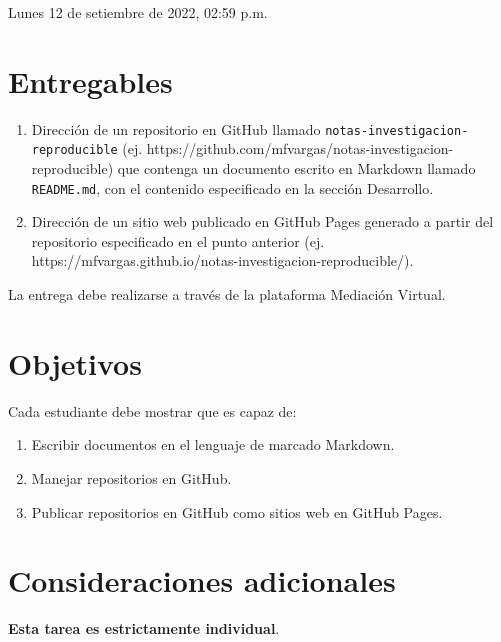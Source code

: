 \documentclass[
  letterpaper,
  DIV=11,
  numbers=noendperiod]{scrreprt}
\providecommand{\tightlist}{%
  \setlength{\itemsep}{0pt}\setlength{\parskip}{0pt}}\usepackage{longtable,booktabs,array}
\begin{document}
Lunes 12 de setiembre de 2022, 02:59 p.m.

\hypertarget{entregables}{%
\section*{Entregables}\label{entregables}}

\begin{enumerate}
\def\labelenumi{\arabic{enumi}.}
\tightlist
\item
  Dirección de un repositorio en GitHub llamado
  \texttt{notas-investigacion-reproducible} (ej.
  https://github.com/mfvargas/notas-investigacion-reproducible) que
  contenga un documento escrito en Markdown llamado \texttt{README.md},
  con el contenido especificado en la sección Desarrollo.
\item
  Dirección de un sitio web publicado en GitHub Pages generado a partir
  del repositorio especificado en el punto anterior (ej.
  https://mfvargas.github.io/notas-investigacion-reproducible/).
\end{enumerate}

La entrega debe realizarse a través de la plataforma Mediación Virtual.

\hypertarget{objetivos}{%
\section*{Objetivos}\label{objetivos}}

Cada estudiante debe mostrar que es capaz de:

\begin{enumerate}
\def\labelenumi{\arabic{enumi}.}
\tightlist
\item
  Escribir documentos en el lenguaje de marcado Markdown.
\item
  Manejar repositorios en GitHub.
\item
  Publicar repositorios en GitHub como sitios web en GitHub Pages.
\end{enumerate}

\hypertarget{consideraciones-adicionales}{%
\section*{Consideraciones
adicionales}\label{consideraciones-adicionales}}

\textbf{Esta tarea es estrictamente individual}.
\end{document}
